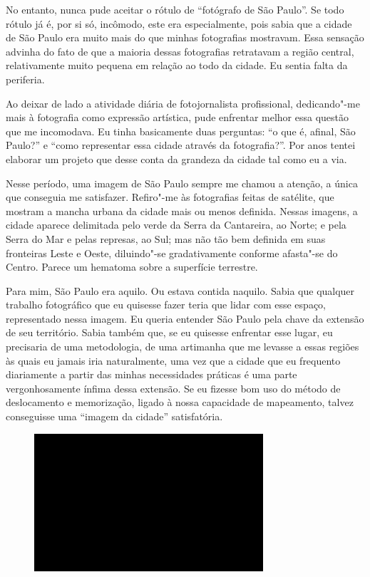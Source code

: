No entanto, nunca pude aceitar o rótulo de ``fotógrafo de São Paulo''.
Se todo rótulo já é, por si só, incômodo, este era especialmente, pois
sabia que a cidade de São Paulo era muito mais do que minhas fotografias
mostravam. Essa sensação advinha do fato de que a maioria dessas
fotografias retratavam a região central, relativamente muito pequena em
relação ao todo da cidade. Eu sentia falta da periferia.

Ao deixar de lado a atividade diária de fotojornalista profissional,
dedicando"-me mais à fotografia como expressão artística, pude enfrentar
melhor essa questão que me incomodava. Eu tinha basicamente duas
perguntas: ``o que é, afinal, São Paulo?'' e ``como representar essa
cidade através da fotografia?''. Por anos tentei elaborar um projeto que
desse conta da grandeza da cidade tal como eu a via.

Nesse período, uma imagem de São Paulo sempre me chamou a atenção, a
única que conseguia me satisfazer. Refiro"-me às fotografias feitas de
satélite, que mostram a mancha urbana da cidade mais ou menos definida.
Nessas imagens, a cidade aparece delimitada pelo verde da Serra da
Cantareira, ao Norte; e pela Serra do Mar e pelas represas, ao Sul; mas
não tão bem definida em suas fronteiras Leste e Oeste, diluindo"-se
gradativamente conforme afasta"-se do Centro. Parece um hematoma sobre a
superfície terrestre.

Para mim, São Paulo era aquilo. Ou estava contida naquilo. Sabia que
qualquer trabalho fotográfico que eu quisesse fazer teria que lidar com
esse espaço, representado nessa imagem. Eu queria entender São Paulo
pela chave da extensão de seu território. Sabia também que, se eu
quisesse enfrentar esse lugar, eu precisaria de uma metodologia, de uma
artimanha que me levasse a essas regiões às quais eu jamais iria
naturalmente, uma vez que a cidade que eu frequento diariamente a
partir das minhas necessidades práticas é uma parte vergonhosamente
ínfima dessa extensão. Se eu fizesse bom uso do método de deslocamento e
memorização, ligado à nossa capacidade de mapeamento, talvez conseguisse
uma ``imagem da cidade'' satisfatória.

\begin{figure}[!ht]
\centering
 \includegraphics[width=85mm]{./imgs/im1.jpg}
\caption{\tiny{}}
\end{figure}

